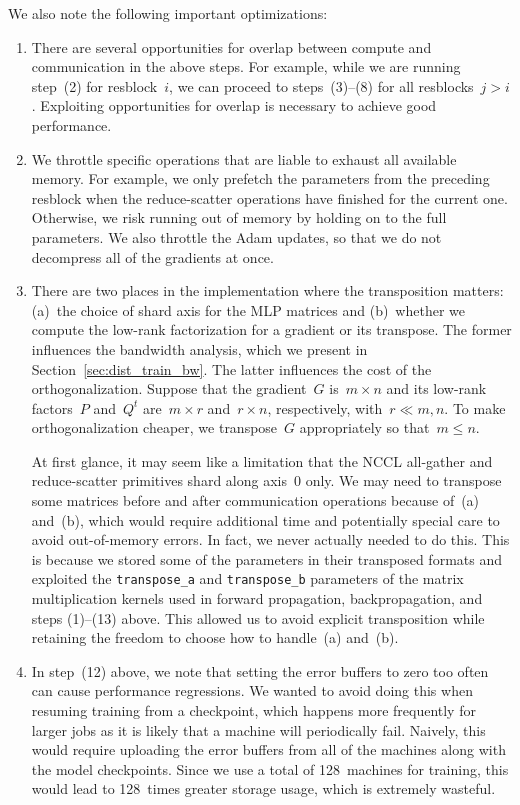 \documentclass{article}
\begin{document}
We also note the following important optimizations:
\begin{enumerate}
    \item There are several opportunities for overlap between compute and communication in the above steps. For example, while we are running step~(2) for resblock~$i$, we can proceed to steps~(3)--(8) for all resblocks~$j > i$. Exploiting opportunities for overlap is necessary to achieve good performance.
    \item We throttle specific operations that are liable to exhaust all available memory. For example, we only prefetch the parameters from the preceding resblock when the reduce-scatter operations have finished for the current one. Otherwise, we risk running out of memory by holding on to the full parameters. We also throttle the Adam updates, so that we do not decompress all of the gradients at once.
    \item There are two places in the implementation where the transposition matters: (a)~the choice of shard axis for the MLP matrices and (b)~whether we compute the low-rank factorization for a gradient or its transpose. The former influences the bandwidth analysis, which we present in Section~\ref{sec:dist_train_bw}. The latter influences the cost of the orthogonalization. Suppose that the gradient~$G$ is~$m \times n$ and its low-rank factors~$P$ and~$Q^t$ are~$m \times r$ and~$r \times n$, respectively, with~$r \ll m, n$. To make orthogonalization cheaper, we transpose~$G$ appropriately so that~$m \leqslant n$.
    
    At first glance, it may seem like a limitation that the NCCL all-gather and reduce-scatter primitives shard along axis~0 only. We may need to transpose some matrices before and after communication operations because of~(a) and~(b), which would require additional time and potentially special care to avoid out-of-memory errors. In fact, we never actually needed to do this. This is because we stored some of the parameters in their transposed formats and exploited the \texttt{transpose\_a} and \texttt{transpose\_b} parameters of the matrix multiplication kernels used in forward propagation, backpropagation, and steps (1)--(13) above. This allowed us to avoid explicit transposition while retaining the freedom to choose how to handle~(a) and~(b).
    \item In step~(12) above, we note that setting the error buffers to zero too often can cause performance regressions. We wanted to avoid doing this when resuming training from a checkpoint, which happens more frequently for larger jobs as it is likely that a machine will periodically fail. Naively, this would require uploading the error buffers from all of the machines along with the model checkpoints. Since we use a total of 128~machines for training, this would lead to 128~times greater storage usage, which is extremely wasteful.
    

\end{enumerate}
\end{document}
